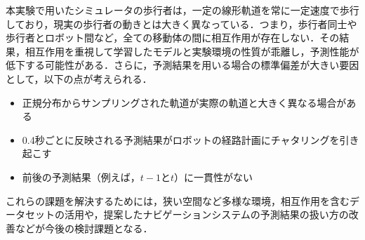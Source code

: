 本実験で用いたシミュレータの歩行者は，一定の線形軌道を常に一定速度で歩行しており，現実の歩行者の動きとは大きく異なっている．つまり，歩行者同士や歩行者とロボット間など，全ての移動体の間に相互作用が存在しない．その結果，相互作用を重視して学習したモデルと実験環境の性質が乖離し，予測性能が低下する可能性がある．さらに，予測結果を用いる場合の標準偏差が大きい要因として，以下の点が考えられる．
\begin{itemize}
  \item 正規分布からサンプリングされた軌道が実際の軌道と大きく異なる場合がある
  \item 0.4秒ごとに反映される予測結果がロボットの経路計画にチャタリングを引き起こす
  \item 前後の予測結果（例えば，$t-1\text{と}t$）に一貫性がない
\end{itemize}
これらの課題を解決するためには，狭い空間など多様な環境，相互作用を含むデータセットの活用や，提案したナビゲーションシステムの予測結果の扱い方の改善などが今後の検討課題となる．

\newpage
